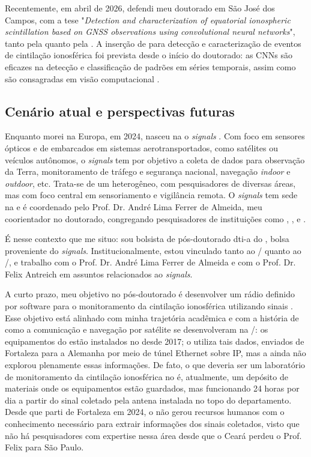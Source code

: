 \documentclass{article}
\begin{document}
Recentemente, em abril de 2026, defendi meu doutorado em São José dos Campos, com a tese "\emph{Detection and characterization of equatorial ionospheric scintillation based on GNSS observations using convolutional neural networks}", tanto pela  quanto pela . A inserção de  para detecção e caracterização de eventos de cintilação ionosférica foi prevista desde o início do doutorado: as CNNs são eficazes na detecção e classificação de padrões em séries temporais, assim como são consagradas em visão computacional \cite{ismailfawazDeepLearningTime2019}.

\subsection{Cenário atual e perspectivas futuras}

Enquanto morei na Europa, em 2024, nasceu na  o  \textit{signals} \cite{andrelimaferrerdealmeidaINCTSignals}. Com foco em sensores ópticos e de  embarcados em sistemas aerotransportados, como satélites ou veículos autônomos, o  \textit{signals} tem por objetivo a coleta de dados para observação da Terra, monitoramento de tráfego e segurança nacional, navegação \textit{indoor} e \textit{outdoor}, etc. Trata-se de um  heterogêneo, com pesquisadores de diversas áreas, mas com foco central em sensoriamento e vigilância remota. O  \textit{signals} tem sede na  e é coordenado pelo Prof. Dr. André Lima Ferrer de Almeida, meu coorientador no doutorado, congregando pesquisadores de instituições como , ,  e .

É nesse contexto que me situo: sou bolsista de pós-doutorado \gls{dti-a} do , bolsa proveniente do  \textit{signals}. Institucionalmente, estou vinculado tanto ao / quanto ao /, e trabalho com o Prof. Dr. André Lima Ferrer de Almeida e com o Prof. Dr. Felix Antreich em assuntos relacionados ao  \textit{signals}.

A curto prazo, meu objetivo no pós-doutorado é desenvolver um rádio definido por software para o monitoramento da cintilação ionosférica utilizando sinais . Esse objetivo está alinhado com minha trajetória acadêmica e com a história de como a comunicação e navegação por satélite se desenvolveram na /: os equipamentos do  estão instalados no  desde 2017; o  utiliza tais dados, enviados de Fortaleza para a Alemanha por meio de túnel Ethernet sobre IP, mas a  ainda não explorou plenamente essas informações. De fato, o que deveria ser um laboratório de monitoramento da cintilação ionosférica no  é, atualmente, um depósito de materiais onde os equipamentos estão guardados, mas funcionando 24 horas por dia a partir do sinal coletado pela antena instalada no topo do departamento. Desde que parti de Fortaleza em 2024, o  não gerou recursos humanos com o conhecimento necessário para extrair informações dos sinais  coletados, visto que não há pesquisadores com expertise nessa área desde que o Ceará perdeu o Prof. Felix para São Paulo.
\end{document}

